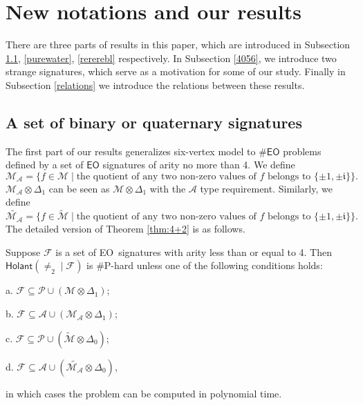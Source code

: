 \documentclass[a4paper,UKenglish,cleveref, autoref, thm-restate]{lipics-v2021}
\newcommand{\hol}[0]{\textsf{Holant}}
\newcommand{\eo}[0]{\textsf{EO}}
\begin{document}
\section{New notations and our results}\label{resultm}
 
 There are three parts of results in this paper, which are introduced in Subsection \ref{2+4}, \ref{purewater}, \ref{rererebl} respectively. In Subsection \ref{4056}, we introduce two strange signatures, which serve as a motivation for some of our study. Finally in Subsection \ref{relations} we introduce the relations between these results.



\subsection{A set of binary or quaternary signatures}\label{2+4}

The first part of our results generalizes six-vertex model to $\#\eo$ problems defined by a set of $\eo$ signatures of arity no more than 4.  We define $$\mathscr{M}_{\mathscr{A}}=\{f\in\mathscr{M}\mid\text{the quotient of any two non-zero values of } f \text{ belongs to } \{\pm1,\pm\mathfrak{i}\}\}.$$ $\mathscr{M}_{\mathscr{A}} \otimes \Delta_1$ can be seen as $\mathscr{M} \otimes \Delta_1$ with the $\mathscr{A}$ type requirement. 
Similarly, we define $$\widetilde{\mathscr{M}_{\mathscr{A}}}=\{f\in\widetilde{\mathscr{M}}\mid\text{the quotient of } \text{any two } \text{non-zero values } \text{of }f \text{ belongs to } \{\pm1,\pm\mathfrak{i}\}\}.$$
The detailed version of Theorem \ref{thm:4+2} is as follows.

\begin{theorem}\label{arity4setdichotomy}
Suppose $\mathcal{F}$ is a set of \eo\ signatures with arity less than or equal to 4. Then $\hol(\neq_2\mid\mathcal{F})$ is \#P-hard unless one of the following conditions holds:

a. $\mathcal{F}\subseteq \mathscr{P}\cup(\mathscr{M}\otimes\Delta_1)$;

b. $\mathcal{F}\subseteq \mathscr{A}\cup(\mathscr{M}_{\mathscr{A}}\otimes\Delta_1)$;

c. $\mathcal{F}\subseteq \mathscr{P}\cup(\widetilde{\mathscr{M}}\otimes\Delta_0)$;

d. $\mathcal{F}\subseteq \mathscr{A}\cup(\widetilde{\mathscr{M}_{\mathscr{A}}}\otimes\Delta_0)$,

in which cases the problem can be computed in polynomial time.
\end{theorem}
\end{document}
